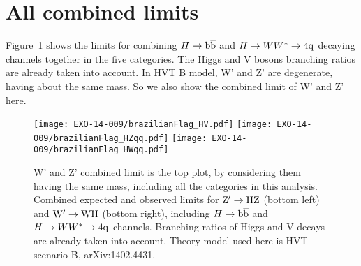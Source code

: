 
\section{All combined limits}
\label{results}

Figure~\ref{fig:HVCombined} shows the limits for combining $H\to\mathrm{b\overline{b}}$ and $H\to WW^*\to4{\rm q}$ decaying channels together in 
the five categories. The Higgs and V bosons branching ratios are already taken into account.  
In HVT B model, W' and Z' are degenerate, having about the same mass. So we also show the combined limit of 
W' and Z' here.  


\begin{figure}[ht!pb]
\begin{center}
\texttt{[image: EXO-14-009/brazilianFlag\_HV.pdf]}
\texttt{[image: EXO-14-009/brazilianFlag\_HZqq.pdf]}
\texttt{[image: EXO-14-009/brazilianFlag\_HWqq.pdf]}
\end{center}
\caption{W' and Z' combined limit is the top plot, by considering them having the same mass, including all the categories in this analysis.   
Combined expected and observed limits for ${\rm Z'\to HZ}$ (bottom left) and ${\rm W' \to WH}$ (bottom right),  including $H\to\mathrm{b\overline{b}}$ and $H\to WW^*\to4{\rm q}$ channels. Branching ratios of Higgs and V decays 
are already taken into account. Theory model used here is HVT scenario B, arXiv:1402.4431.  
}
\label{fig:HVCombined}
\end{figure}

